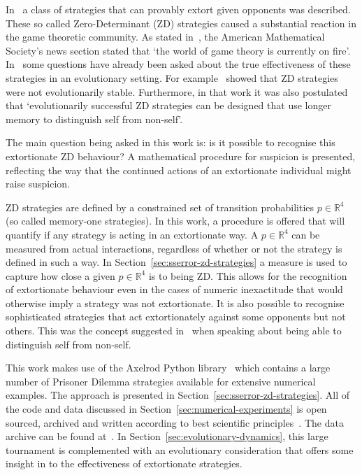 \documentclass[a4paper]{article}
\begin{document}
In~\cite{Press2012} a class of strategies that can provably extort given
opponents was described. These so called Zero-Determinant (ZD) strategies caused
a substantial reaction in the game theoretic community. As stated
in~\cite{hilbe2015partners}, the American Mathematical Society's news section
stated that `the world of game theory is currently on fire'.
In~\cite{adami2013evolutionary, Hilbe2013, hilbe2013adaptive, hilbe2015partners,
ichinose2018zero, Moran1707} some questions have already been asked about the
true effectiveness of these strategies in an evolutionary setting. For
example~\cite{adami2013evolutionary} showed that ZD strategies were not
evolutionarily stable. Furthermore, in that work it was also postulated that
`evolutionarily successful ZD strategies can be designed that use longer memory
to distinguish self from non-self'.

The main question being asked in this work is: is it possible to recognise this
extortionate ZD behaviour? A mathematical procedure for suspicion is presented,
reflecting the way that the continued actions of an extortionate individual
might raise suspicion.

ZD strategies are defined by a constrained set of transition probabilities
\(p\in\mathbb{R}^4\) (so called memory-one strategies). In this work, a
procedure is offered that will quantify if any strategy is acting in an
extortionate way. A \(p\in\mathbb{R}^4\) can be measured from actual
interactions, regardless of whether or not the strategy is defined in such a
way. In Section~\ref{sec:sserror-zd-strategies} a measure is used
to capture how close a given \(p\in\mathbb{R}^4\) is to being ZD.
This allows for the
recognition of extortionate behaviour even in the cases of numeric inexactitude
that would otherwise imply a strategy was not extortionate. It is also possible
to recognise sophisticated strategies that act extortionately against some
opponents but not others. This was the concept suggested
in~\cite{adami2013evolutionary} when speaking about being able to distinguish
self from non-self.

This work makes use of the Axelrod Python library~\cite{Knight2016, Knight2018}
which contains a large number of Prisoner Dilemma strategies available for
extensive numerical examples.  The approach is presented in
Section~\ref{sec:sserror-zd-strategies}.  All of the code and data discussed in
Section~\ref{sec:numerical-experiments} is open sourced, archived and written
according to best scientific principles~\cite{Wilson2014}. The data archive can
be found at~\cite{vincent_knight_2018_1297075}.  In
Section~\ref{sec:evolutionary-dynamics}, this large tournament is complemented
with an evolutionary consideration that offers some insight in to the
effectiveness of extortionate strategies.
\end{document}
